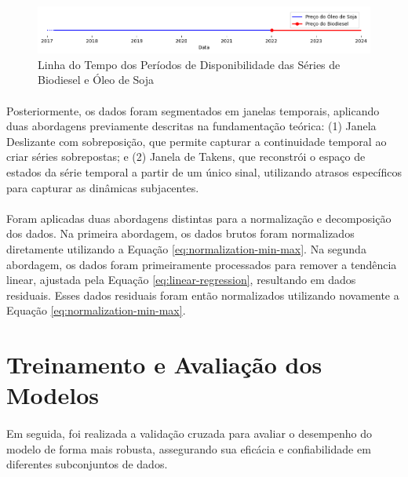 \begin{figure}
	\begin{center}
		\begin{center}
			\includegraphics[width=\textwidth]{figuras/series_timeline.png}
			\caption{Linha do Tempo dos Períodos de Disponibilidade das Séries de Biodiesel e Óleo de Soja}
			\label{fig:series_timeline}
		\end{center}

	\end{center}
\end{figure}

\paragraph{} Posteriormente, os dados foram segmentados em janelas temporais, aplicando duas abordagens previamente descritas na fundamentação teórica: (1) Janela Deslizante com sobreposição, que permite capturar a continuidade temporal ao criar séries sobrepostas; e (2) Janela de Takens, que reconstrói o espaço de estados da série temporal a partir de um único sinal, utilizando atrasos específicos para capturar as dinâmicas subjacentes.
\paragraph{} Foram aplicadas duas abordagens distintas para a normalização e decomposição dos dados. Na primeira abordagem, os dados brutos foram normalizados diretamente utilizando a Equação \ref{eq:normalization-min-max}. Na segunda abordagem, os dados foram primeiramente processados para remover a tendência linear, ajustada pela Equação \ref{eq:linear-regression}, resultando em dados residuais. Esses dados residuais foram então normalizados utilizando novamente a Equação \ref{eq:normalization-min-max}.

\section{Treinamento e Avaliação dos Modelos}
\paragraph{} Em seguida, foi realizada a validação cruzada para avaliar o desempenho do modelo de forma mais robusta, assegurando sua eficácia e confiabilidade em diferentes subconjuntos de dados.
